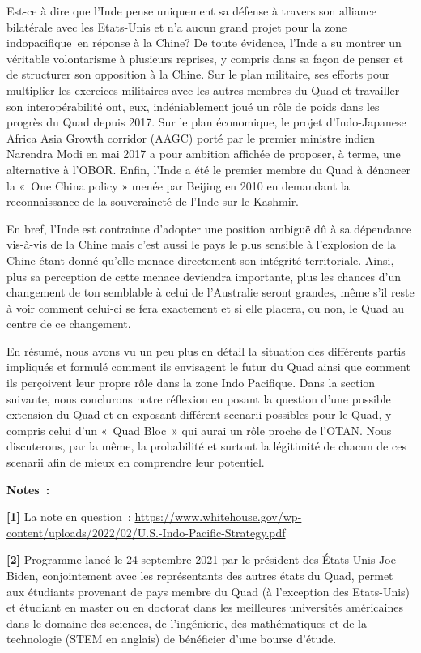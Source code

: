 \documentclass[11pt,a4paper]{article}
\begin{document}
Est-ce à dire que l'Inde pense uniquement sa défense à travers son alliance bilatérale avec les Etats-Unis et n'a aucun grand projet pour la zone indopacifique~en réponse à la Chine? De toute évidence, l'Inde a su montrer un véritable volontarisme à plusieurs reprises, y compris dans sa façon de penser et de structurer son opposition à la Chine. Sur le plan militaire, ses efforts pour multiplier les exercices militaires avec les autres membres du Quad et travailler son interopérabilité ont, eux, indéniablement joué un rôle de poids dans les progrès du Quad depuis 2017. Sur le plan économique, le projet d'Indo-Japanese Africa Asia Growth corridor (AAGC) porté par le premier ministre indien Narendra Modi en mai 2017 a pour ambition affichée de proposer, à terme, une alternative à l'OBOR. Enfin, l'Inde a été le premier membre du Quad à dénoncer la «~One China policy » menée par Beijing en 2010 en demandant la reconnaissance de la souveraineté de l'Inde sur le Kashmir.

En bref, l'Inde est contrainte d'adopter une position ambiguë dû à sa dépendance vis-à-vis de la Chine mais c'est aussi le pays le plus sensible à l'explosion de la Chine étant donné qu'elle menace directement son intégrité territoriale. Ainsi, plus sa perception de cette menace deviendra importante, plus les chances d'un changement de ton semblable à celui de l'Australie seront grandes, même s'il reste à voir comment celui-ci se fera exactement et si elle placera, ou non, le Quad au centre de ce changement.

En résumé, nous avons vu un peu plus en détail la situation des différents partis impliqués et formulé comment ils envisagent le futur du Quad ainsi que comment ils perçoivent leur propre rôle dans la zone Indo Pacifique. Dans la section suivante, nous conclurons notre réflexion en posant la question d'une possible extension du Quad et en exposant différent scenarii possibles pour le Quad, y compris celui d'un «~Quad Bloc~» qui aurai un rôle proche de l'OTAN. Nous discuterons, par la même, la probabilité et surtout la légitimité de chacun de ces scenarii afin de mieux en comprendre leur potentiel.

\textbf{Notes~:}

\textbf{{[}1{]}} La note en question~: \url{https://www.whitehouse.gov/wp-content/uploads/2022/02/U.S.-Indo-Pacific-Strategy.pdf}

\textbf{{[}2{]}} Programme lancé le 24 septembre 2021 par le président des États-Unis Joe Biden, conjointement avec les représentants des autres états du Quad, permet aux étudiants provenant de pays membre du Quad (à l'exception des Etats-Unis) et étudiant en master ou en doctorat dans les meilleures universités américaines dans le domaine des sciences, de l'ingénierie, des mathématiques et de la technologie (STEM en anglais) de bénéficier d'une bourse d'étude.
\end{document}
